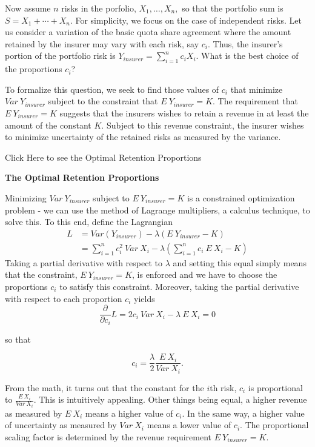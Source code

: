 \documentclass[]{book}
\theoremstyle{definition}
\theoremstyle{definition}
\theoremstyle{definition}
\theoremstyle{remark}
\begin{document}
Now assume \(n\) risks in the porfolio, \(X_1, \ldots, X_n,\) so that
the portfolio sum is \(S= X_1 + \cdots + X_n\). For simplicity, we focus
on the case of independent risks. Let us consider a variation of the
basic quota share agreement where the amount retained by the insurer may
vary with each risk, say \(c_i\). Thus, the insurer's portion of the
portfolio risk is \(Y_{insurer} = \sum_{i=1}^n c_i X_i\). What is the
best choice of the proportions \(c_i\)?

To formalize this question, we seek to find those values of \(c_i\) that
minimize \(Var ~Y_{insurer}\) subject to the constraint that
\(E ~Y_{insurer} = K.\) The requirement that \(E ~Y_{insurer} = K\)
suggests that the insurers wishes to retain a revenue in at least the
amount of the constant \(K\). Subject to this revenue constraint, the
insurer wishes to minimize uncertainty of the retained risks as measured
by the variance.

Click Here to see the Optimal Retention Proportions

\hypertarget{toggleDerivationProof}{}
\textbf{The Optimal Retention Proportions}

Minimizing \(Var ~Y_{insurer}\) subject to \(E ~Y_{insurer} = K\) is a
constrained optimization problem - we can use the method of Lagrange
multipliers, a calculus technique, to solve this. To this end, define
the Lagrangian \[
\begin{array}{ll}
L &= Var (Y_{insurer}) - \lambda (E ~Y_{insurer} - K) \\
&= \sum_{i=1}^n c_i^2 ~Var ~X_i - \lambda (\sum_{i=1}^n c_i ~E ~X_i - K) 
\end{array}
\] Taking a partial derivative with respect to \(\lambda\) and setting
this equal simply means that the constraint, \(E ~Y_{insurer} = K\), is
enforced and we have to choose the proportions \(c_i\) to satisfy this
constraint. Moreover, taking the partial derivative with respect to each
proportion \(c_i\) yields \[
\frac{\partial}{\partial c_i} L = 2 c_i ~Var~ X_i - \lambda ~E ~X_i = 0 
\]

so that

\[
c_i  =  \frac{\lambda}{2} \frac{E ~X_i}{Var ~X_i} .
\]

From the math, it turns out that the constant for the \(i\)th risk,
\(c_i\) is proportional to \(\frac{E ~X_i}{Var ~X_i}\). This is
intuitively appealing. Other things being equal, a higher revenue as
measured by \(E ~X_i\) means a higher value of \(c_i\). In the same way,
a higher value of uncertainty as measured by \(Var ~X_i\) means a lower
value of \(c_i\). The proportional scaling factor is determined by the
revenue requirement \(E ~Y_{insurer} = K\).
\end{document}

